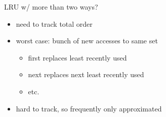 
\begin{frame}{LRU w/ more than two ways?}
    \begin{itemize}
    \item need to track total order
    \item worst case: bunch of new accesses to same set
        \begin{itemize}
        \item first replaces least recently used
        \item next replaces next least recently used
        \item etc.
        \end{itemize}
    \vspace{.5cm}
    \item hard to track, so frequently only approximated
    \end{itemize}
\end{frame}
